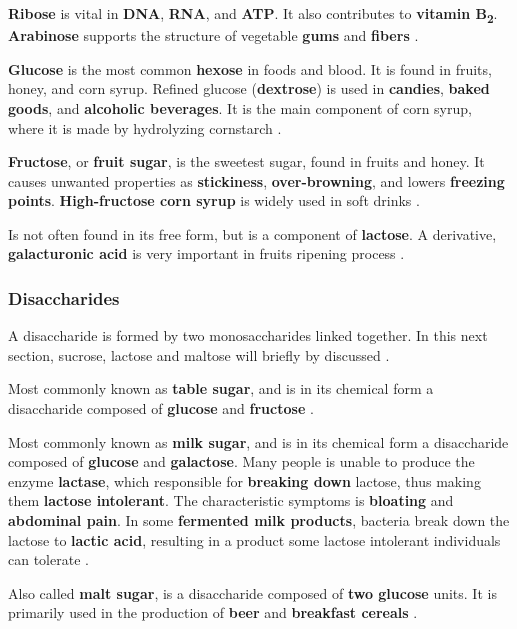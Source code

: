 \textbf{Ribose} is vital in \textbf{DNA}, \textbf{RNA}, and \textbf{ATP}. It also contributes to \textbf{vitamin B\textsubscript{2}}. \textbf{Arabinose} supports the structure of vegetable \textbf{gums} and \textbf{fibers} \cite*{BKR_02}.

\textbf{Glucose} is the most common \textbf{hexose} in foods and blood. It is found in fruits, honey, and corn syrup. Refined glucose (\textbf{dextrose}) is used in \textbf{candies}, \textbf{baked goods}, and \textbf{ alcoholic beverages}. It is the main component of corn syrup, where it is made by hydrolyzing cornstarch \cite*{BKR_02}.

\textbf{Fructose}, or \textbf{fruit sugar}, is the sweetest sugar, found in fruits and honey. It causes unwanted properties as \textbf{stickiness}, \textbf{over-browning}, and lowers \textbf{freezing points}. \textbf{High-fructose corn syrup} is widely used in soft drinks \cite*{BKR_02}.

Is not often found in its free form, but is a component of \textbf{lactose}. A derivative, \textbf{galacturonic acid} is very important in fruits ripening process  \cite*{BKR_02}.

\subsubsection*{Disaccharides}
A disaccharide is formed by two monosaccharides linked together. In this next section, sucrose, lactose and maltose will briefly by discussed \cite*{BKR_02}.

Most commonly known as \textbf{table sugar}, and is in its chemical form a disaccharide composed of \textbf{glucose} and \textbf{fructose} \cite*{BKR_02}.

Most commonly known as \textbf{milk sugar}, and is in its chemical form a disaccharide composed of \textbf{glucose} and \textbf{galactose}. Many people is unable to produce the enzyme \textbf{lactase}, which responsible for \textbf{breaking down} lactose, thus making them \textbf{lactose intolerant}. The characteristic symptoms is \textbf{bloating} and \textbf{abdominal pain}. In some \textbf{fermented milk products}, bacteria break down the lactose to \textbf{lactic acid}, resulting in a product some lactose intolerant individuals can tolerate \cite*{BKR_02}.

Also called \textbf{malt sugar}, is a disaccharide composed of \textbf{two glucose} units. It is primarily used in the production of \textbf{beer} and \textbf{breakfast cereals} \cite*{BKR_02}.

